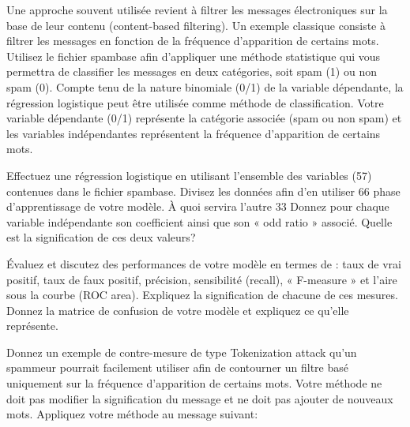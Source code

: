 	\begin{homeworkProblem}[Méthode statistique]
	
			Une approche souvent utilisée revient à filtrer les messages électroniques sur la base de
			leur contenu (content-based filtering). Un exemple classique consiste à filtrer les
			messages en fonction de la fréquence d’apparition de certains mots. Utilisez le fichier
			spambase afin d’appliquer une méthode statistique qui vous permettra de classifier les
			messages en deux catégories, soit spam (1) ou non spam (0).
			Compte tenu de la nature binomiale (0/1) de la variable dépendante, la régression
			logistique  peut être utilisée comme méthode de classification. Votre variable
			dépendante (0/1) représente la catégorie associée (spam ou non spam) et les variables
			indépendantes représentent la fréquence d’apparition de certains mots.	
	
		\begin{homeworkSection}{2.1}

			Effectuez une régression logistique en utilisant l’ensemble des variables (57)
			contenues dans le fichier spambase. Divisez les données afin d’en utiliser 66%
			phase d’apprentissage de votre modèle. À quoi servira l’autre 33%
			Donnez pour chaque variable indépendante son coefficient ainsi que son « odd ratio »
			associé. Quelle est la signification de ces deux valeurs?

			\problemAnswer{
			
			}
			
		\end{homeworkSection}
		
		\begin{homeworkSection}{2.2}
			
			Évaluez et discutez des performances de votre modèle en termes de : taux de vrai
			positif, taux de faux positif, précision, sensibilité (recall), « F-measure » et l’aire sous la
			courbe (ROC area). Expliquez la signification de chacune de ces mesures.
			Donnez la matrice de confusion de votre modèle et expliquez ce qu’elle représente. 
	
			\problemAnswer{
			
			}
			
		\end{homeworkSection}
			
		\begin{homeworkSection}{2.3}
			
			Donnez un exemple de contre-mesure de type Tokenization attack qu’un spammeur
			pourrait facilement utiliser afin de contourner un filtre basé uniquement sur la fréquence
			d’apparition de certains mots. Votre méthode ne doit pas modifier la signification du
			message et ne doit pas ajouter de nouveaux mots. Appliquez votre méthode au message
			suivant:\\


\end{homeworkSection}
\end{homeworkProblem}
